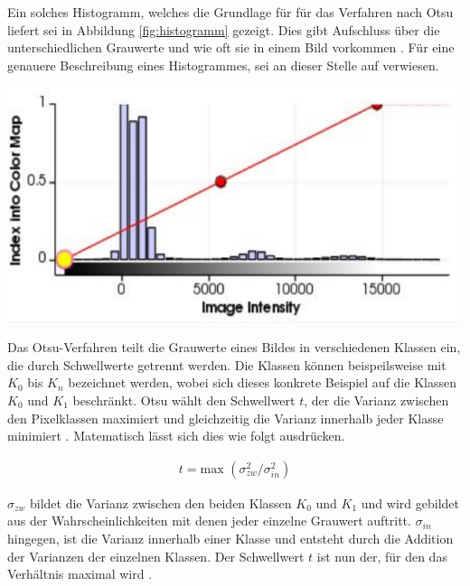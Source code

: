 \begin{minipage}{0.40\textwidth}
	Ein solches Histogramm, welches die Grundlage für für das Verfahren nach Otsu
	liefert sei in Abbildung \ref{fig:histogramm} gezeigt. Dies gibt Aufschluss über
	die unterschiedlichen Grauwerte und wie oft sie in einem Bild vorkommen \citep[vgl.][Seite264]{lehmann2013bildverarbeitung}.
	Für eine genauere Beschreibung eines Histogrammes, sei an dieser Stelle auf \citet[Seite42]{burger2009}
	verwiesen.
\end{minipage}
\hfill
\begin{minipage}{0.50\textwidth}
	\centering
	\includegraphics[width=1\textwidth]{img/histogramm.jpg}
	 \label{fig:histogramm}
\end{minipage}

Das Otsu-Verfahren teilt die Grauwerte eines Bildes in verschiedenen Klassen ein,
die durch Schwellwerte getrennt werden. Die Klassen können beispeilsweise mit
$K_{0}$ bis $K_{n}$ bezeichnet werden, wobei sich dieses konkrete Beispiel auf die
Klassen $K_{0}$ und $K_{1}$ beschränkt. Otsu wählt den Schwellwert $t$, der die Varianz
zwischen den Pixelklassen maximiert und gleichzeitig die Varianz innerhalb jeder
Klasse minimiert \citep[vgl.][Seite264]{lehmann2013bildverarbeitung}.
Matematisch lässt sich dies wie folgt ausdrücken.

\begin{align}
	t = \text{max }(\sigma_{zw}^{2}/ \sigma_{in}^{2})
\end{align}

$\sigma_{zw}$ bildet die Varianz zwischen den beiden Klassen $K_{0}$ und $K_{1}$
und wird gebildet aus der Wahrscheinlichkeiten mit denen jeder einzelne Grauwert
auftritt. $\sigma_{in}$ hingegen, ist die Varianz innerhalb einer Klasse und entsteht
durch die Addition der Varianzen der einzelnen Klassen. Der Schwellwert $t$ ist
nun der, für den das Verhältnis maximal wird \citep[vgl.][Seite264]{lehmann2013bildverarbeitung}.

